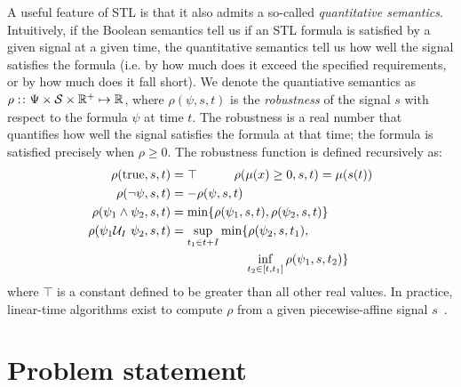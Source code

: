 A useful feature of STL is that it also admits a so-called \textit{quantitative semantics}. Intuitively, if the Boolean semantics tell us if an STL formula is satisfied by a given signal at a given time, the quantitative semantics tell us how well the signal satisfies the formula (i.e. by how much does it exceed the specified requirements, or by how much does it fall short). We denote the quantiative semantics as $\rho: \colon \Psi \times \mathcal{S} \times \mathbb{R}^+ \mapsto \mathbb{R}$, where $\rho(\psi, s, t)$ is the \textit{robustness} of the signal $s$ with respect to the formula $\psi$ at time $t$. The robustness is a real number that quantifies how well the signal satisfies the formula at that time; the formula is satisfied precisely when $\rho \geq 0$. The robustness function is defined recursively as:
\begin{align*}
    \rho(\text{true}, s, t)             & = \top \qquad \quad \rho(\mu(x) \geq 0, s, t) = \mu(s(t))           \\
    \rho(\neg\psi, s, t)                & = -\rho(\psi, s, t)                                                 \\
    \rho(\psi_1 \wedge \psi_2, s, t)    & = \min\{\rho(\psi_1, s, t), \rho(\psi_2, s, t)\}                    \\
    \rho(\psi_1 \mathcal{U}_I\ \psi_2, s, t) & = \sup_{t_1 \in t + I} \min\{\rho(\psi_2, s, t_1),                  \\
                                        & \qquad \qquad \qquad \inf_{t_2 \in [t, t_1]} \rho(\psi_1, s, t_2)\}
\end{align*}
where $\top$ is a constant defined to be greater than all other real values. In practice, linear-time algorithms exist to compute $\rho$ from a given piecewise-affine signal $s$~\cite{donzeEfficientRobustMonitoring2013a}.

\section{Problem statement}

